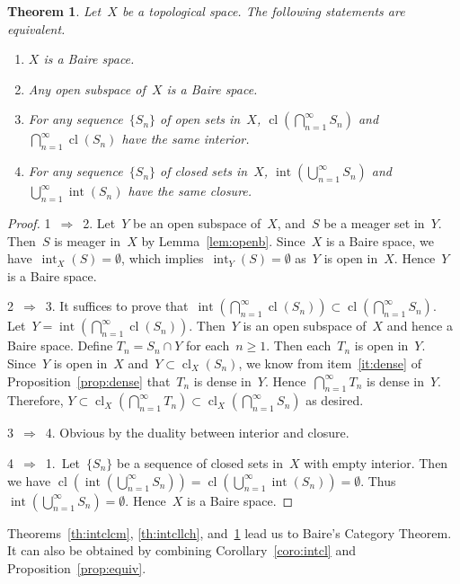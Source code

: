 \documentclass[11pt,a4paper]{article}  %
\newtheorem{theorem}{Theorem}[section]
\theoremstyle{definition}
\DeclareMathOperator{\inter}{int}
\DeclareMathOperator{\cl}{cl}
\numberwithin{equation}{section}
\begin{document}
\begin{theorem}
  \label{th:intcl}
   Let~$X$ be a topological space. The following statements are equivalent.
   \begin{enumerate}
     \item $X$ is a Baire space.
     \item Any open subspace of~$X$ is a Baire space.
     \item For any sequence~$\{S_n\}$ of open sets in~$X$, $\cl(\bigcap_{n=1}^\infty S_n)$ and
       $\bigcap_{n=1}^\infty \cl(S_n)$ have the same interior.
     \item For any sequence~$\{S_n\}$ of closed sets in~$X$, $\inter(\bigcup_{n=1}^\infty S_n)$ and
       $\bigcup_{n=1}^\infty \inter(S_n)$ have the same closure.
   \end{enumerate}
\end{theorem}

\begin{proof}
  1~$\Rightarrow$~2. Let~$Y$ be an open subspace of~$X$, and~$S$ be a meager set in~$Y$.
  Then~$S$ is meager in~$X$ by Lemma~\ref{lem:openb}. Since~$X$ is a Baire space, we
  have~$\inter_X(S)=\emptyset$, which implies~$\inter_Y(S)=\emptyset$ as~$Y$ is open in~$X$.
  Hence~$Y$ is a Baire space.

  2~$\Rightarrow$~3. It suffices to prove that~$\inter(\bigcap_{n=1}^\infty \cl(S_n))\subset\cl(\bigcap_{n=1}^\infty S_n)$.
  Let~$Y=\inter(\bigcap_{n=1}^\infty \cl(S_n))$. Then~$Y$ is an open subspace of~$X$ and hence a Baire space.
  Define $T_n = S_n\cap Y$ for each~$n\ge 1$. Then each~$T_n$ is open in~$Y$. Since~$Y$ is open
  in~$X$ and~$Y\subset \cl_X(S_n)$, we know from item~\ref{it:dense} of Proposition~\ref{prop:dense}
  that~$T_n$ is dense in~$Y$. Hence~$\bigcap_{n=1}^\infty T_n$
  is dense in~$Y$. Therefore, $Y \subset \cl_X(\bigcap_{n=1}^\infty T_n) \subset
  \cl_X(\bigcap_{n=1}^\infty S_n)$ as desired.

  3~$\Rightarrow$~4. Obvious by the duality between interior and closure.

  4~$\Rightarrow$~1.~Let~$\{S_n\}$ be a sequence of closed sets in~$X$ with empty interior. Then we
    have
  $\cl(\inter(\bigcup_{n=1}^\infty S_n)) = \cl(\bigcup_{n=1}^\infty \inter(S_n)) = \emptyset$.
  Thus~$\inter(\bigcup_{n=1}^\infty S_n) = \emptyset$. Hence~$X$ is a Baire space.
\end{proof}

Theorems~\ref{th:intclcm}, \ref{th:intcllch}, and~\ref{th:intcl} lead us to Baire's Category
Theorem. It can also be obtained by combining Corollary~\ref{coro:intcl} and Proposition~\ref{prop:equiv}.
\end{document}
